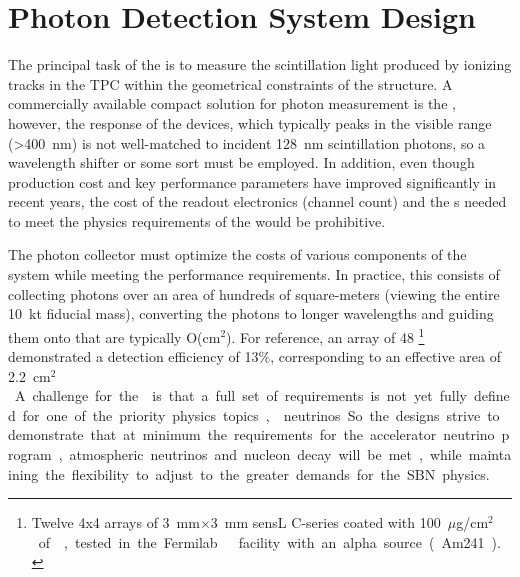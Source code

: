 \section{Photon Detection System Design}
\label{sec:fdsp-pd-design}


The principal task of the  is to measure the  scintillation light produced by ionizing tracks in the TPC within the geometrical constraints of the  structure. A commercially available compact solution for photon measurement is the , however, the response of the devices, which typically peaks in the visible range (>\SI{400}{nm}) is not well-matched to incident \SI{128}{nm} scintillation photons, so a wavelength shifter or some sort must be employed. 
In addition, even though production cost and key performance parameters have improved significantly in recent years, the cost of the readout electronics (channel count) and the s needed to meet the physics requirements of the  would be prohibitive. 

The photon collector must optimize the costs of various components of the system while meeting the performance requirements.  In practice, this consists of collecting  photons over an area of hundreds of square-meters (viewing the entire \SI{10}{kt} \lar fiducial mass), converting the photons to longer wavelengths and guiding them onto  that are typically O(cm$^2$). For reference, an array of \num{48} 
\footnote{Twelve 4x4 arrays of \SI{3}{mm}$\times$\SI{3}{mm} sensL C-series coated with \SI{100}{$\mu$g/cm$^2$} of , tested in the Fermilab  \lar facility with an alpha source (Am241).}  
demonstrated a detection efficiency of 13\%, corresponding to an effective area of \SI{2.2}{cm$^2$}.


A challenge for the  is that a full set of requirements is not yet fully defined for one of the priority physics topics,  neutrinos. So the designs strive to demonstrate that at minimum the requirements for the accelerator neutrino program, atmospheric neutrinos and nucleon decay will be met, while maintaining the flexibility to adjust to the greater demands for the SBN physics.    
 
